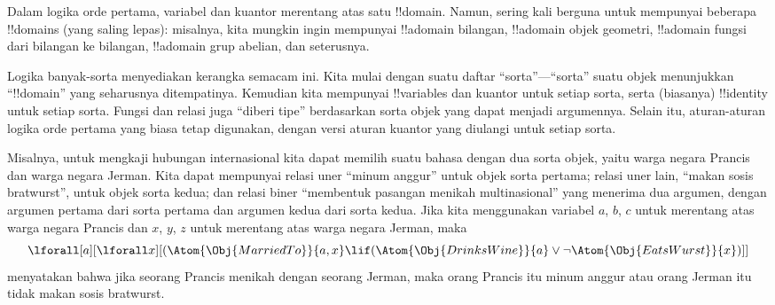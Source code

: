 \documentclass[../../../include/open-logic-section]{subfiles}
\begin{document}


Dalam logika orde pertama, variabel dan kuantor merentang atas satu
!!{domain}. Namun, sering kali berguna untuk mempunyai beberapa !!{domain}s
(yang saling lepas): misalnya, kita mungkin ingin mempunyai !!a{domain}
bilangan, !!a{domain} objek geometri, !!a{domain} fungsi dari bilangan ke
bilangan, !!a{domain} grup abelian, dan seterusnya.

Logika banyak-sorta menyediakan kerangka semacam ini. Kita mulai dengan suatu
daftar ``sorta''---``sorta'' suatu objek menunjukkan ``!!{domain}'' yang
seharusnya ditempatinya. Kemudian kita mempunyai !!{variable}s dan kuantor
untuk setiap sorta, serta (biasanya) !!{identity} untuk setiap sorta. Fungsi
dan relasi juga ``diberi tipe'' berdasarkan sorta objek yang dapat menjadi
argumennya. Selain itu, aturan-aturan logika orde pertama yang biasa tetap
digunakan, dengan versi aturan kuantor yang diulangi untuk setiap sorta.

Misalnya, untuk mengkaji hubungan internasional kita dapat memilih suatu
bahasa dengan dua sorta objek, yaitu warga negara Prancis dan warga negara
Jerman. Kita dapat mempunyai relasi uner ``minum anggur'' untuk objek sorta
pertama; relasi uner lain, ``makan sosis bratwurst'', untuk objek sorta kedua;
dan relasi biner ``membentuk pasangan menikah multinasional'' yang menerima
dua argumen, dengan argumen pertama dari sorta pertama dan argumen kedua dari
sorta kedua. Jika kita menggunakan variabel $a$, $b$, $c$ untuk merentang atas
warga negara Prancis dan $x$, $y$, $z$ untuk merentang atas warga negara
Jerman, maka
\[
\lforall[a][\lforall x][(\Atom{\Obj{MarriedTo}}{a,x} \lif
(\Atom{\Obj{DrinksWine}}{a} \lor \lnot \Atom{\Obj{EatsWurst}}{x})]]
\]
menyatakan bahwa jika seorang Prancis menikah dengan seorang Jerman, maka
orang Prancis itu minum anggur atau orang Jerman itu tidak makan sosis
bratwurst.
\end{document}
